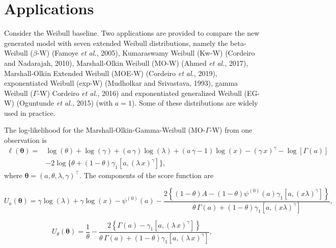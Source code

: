 \documentclass[12pt,a4paper]{article} %
\begin{document}
\section{Applications}\label{applications}

Consider the Weibull baseline. Two applications are provided to compare the new generated model with seven extended Weibull
distributions, namely the beta-Weibull ($\beta$-W) (Famoye {\it et al.}, 2005), Kumaraswamy Weibull (Kw-W) (Cordeiro and Nadarajah, 2010),
Marshall-Olkin Weibull (MO-W) (Ahmed {\it et al.}, 2017), Marshall-Olkin Extended Weibull (MOE-W) (Cordeiro {\it et al.}, 2019),
exponentiated Weibull (exp-W) (Mudholkar and Srivastava, 1993), gamma Weibull ($\Gamma$-W) Cordeiro {\it et al.}, 2016) and exponentiated
generalized Weibull (EG-W) (Oguntunde {\it et al.}, 2015) (with $a=1$). Some of these distributions are widely used in practice.

The log-likelihood for the Marshall-Olkin-Gamma-Weibull (MO-$\Gamma$-W) from one observation is
\begin{align}
\ell (\boldsymbol{\theta})=& \log (\theta)+\log (\gamma)+(a\,\gamma)\log (\lambda)+(a\,\gamma-1)\log(x)-(\gamma\, x)^\gamma-\log[\Gamma(a)]\nonumber \\ &-2\log\{\theta+(1-\theta)\gamma_1[a,(\lambda\,x)^\gamma]\},
\end{align}
where $\boldsymbol{\theta}=(a,\theta,\lambda,\gamma)^\top$. The components of the score function are

\begin{equation*}
U_{a}(\boldsymbol{\theta})=\gamma  \log (\lambda )+\gamma  \log (x)-\psi ^{(0)}(a)-\frac{2\left\{(1-\theta ) A-(1-\theta ) \psi ^{(0)}(a) \gamma_1 \left[a,(x \lambda
   )^{\gamma }\right]\right\}}{\theta\,\Gamma(a)+(1-\theta)\gamma_1\left[a,(x \lambda
   )^{\gamma }\right]},
\end{equation*}

\begin{equation*}
U_{\theta}(\boldsymbol{\theta})=\frac{1}{\theta}-\frac{2\left\{\Gamma(a)-\gamma_1\left[a,(\lambda\,x)^\gamma\right]\right\}}{\theta\,\Gamma(a)+(1-\theta)\gamma_1\left[a,(\lambda\,x)^\gamma\right]},
\end{equation*}
\end{document}
